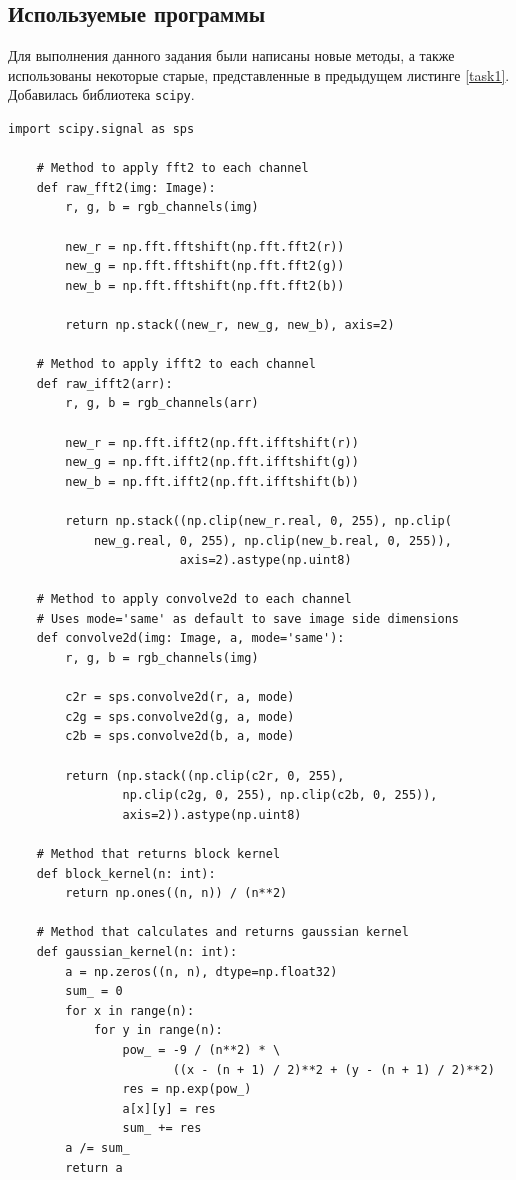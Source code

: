 \documentclass[a4paper, 12pt]{article}
\begin{document}
    \subsection{Используемые программы}
    Для выполнения данного задания были написаны новые методы, а также использованы
    некоторые старые, представленные в предыдущем листинге \ref{task1}. Добавилась библиотека \texttt{scipy}.
    \begin{lstlisting}[label=task2, caption={Программные методы, необходимые для задания 2}]
    import scipy.signal as sps

    # Method to apply fft2 to each channel
    def raw_fft2(img: Image):
        r, g, b = rgb_channels(img)

        new_r = np.fft.fftshift(np.fft.fft2(r))
        new_g = np.fft.fftshift(np.fft.fft2(g))
        new_b = np.fft.fftshift(np.fft.fft2(b))

        return np.stack((new_r, new_g, new_b), axis=2)

    # Method to apply ifft2 to each channel
    def raw_ifft2(arr):
        r, g, b = rgb_channels(arr)

        new_r = np.fft.ifft2(np.fft.ifftshift(r))
        new_g = np.fft.ifft2(np.fft.ifftshift(g))
        new_b = np.fft.ifft2(np.fft.ifftshift(b))

        return np.stack((np.clip(new_r.real, 0, 255), np.clip(
            new_g.real, 0, 255), np.clip(new_b.real, 0, 255)),
                        axis=2).astype(np.uint8)

    # Method to apply convolve2d to each channel
    # Uses mode='same' as default to save image side dimensions
    def convolve2d(img: Image, a, mode='same'):
        r, g, b = rgb_channels(img)

        c2r = sps.convolve2d(r, a, mode)
        c2g = sps.convolve2d(g, a, mode)
        c2b = sps.convolve2d(b, a, mode)

        return (np.stack((np.clip(c2r, 0, 255),
                np.clip(c2g, 0, 255), np.clip(c2b, 0, 255)),
                axis=2)).astype(np.uint8)

    # Method that returns block kernel
    def block_kernel(n: int):
        return np.ones((n, n)) / (n**2)

    # Method that calculates and returns gaussian kernel
    def gaussian_kernel(n: int):
        a = np.zeros((n, n), dtype=np.float32)
        sum_ = 0
        for x in range(n):
            for y in range(n):
                pow_ = -9 / (n**2) * \
                       ((x - (n + 1) / 2)**2 + (y - (n + 1) / 2)**2)
                res = np.exp(pow_)
                a[x][y] = res
                sum_ += res
        a /= sum_
        return a


\end{lstlisting}
\end{document}
